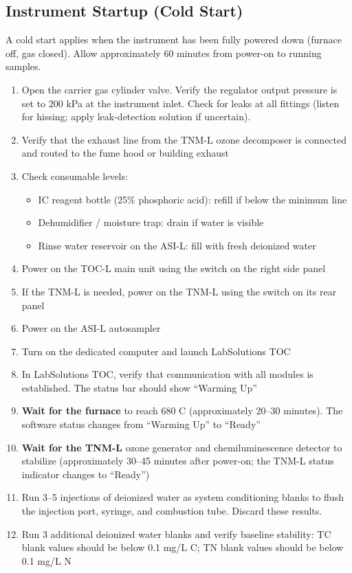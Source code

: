 \documentclass[
  11pt,
  letterpaper,
]{article}
\providecommand{\tightlist}{%
  \setlength{\itemsep}{0pt}\setlength{\parskip}{0pt}}
\begin{document}
\subsection{Instrument Startup (Cold
Start)}\label{instrument-startup-cold-start}

A cold start applies when the instrument has been fully powered down
(furnace off, gas closed). Allow approximately 60 minutes from power-on
to running samples.

\begin{enumerate}
\def\labelenumi{\arabic{enumi}.}
\tightlist
\item
  Open the carrier gas cylinder valve. Verify the regulator output
  pressure is set to 200 kPa at the instrument inlet. Check for leaks at
  all fittings (listen for hissing; apply leak-detection solution if
  uncertain).
\item
  Verify that the exhaust line from the TNM-L ozone decomposer is
  connected and routed to the fume hood or building exhaust
\item
  Check consumable levels:

  \begin{itemize}
  \tightlist
  \item
    IC reagent bottle (25\% phosphoric acid): refill if below the
    minimum line
  \item
    Dehumidifier / moisture trap: drain if water is visible
  \item
    Rinse water reservoir on the ASI-L: fill with fresh deionized water
  \end{itemize}
\item
  Power on the TOC-L main unit using the switch on the right side panel
\item
  If the TNM-L is needed, power on the TNM-L using the switch on its
  rear panel
\item
  Power on the ASI-L autosampler
\item
  Turn on the dedicated computer and launch LabSolutions TOC
\item
  In LabSolutions TOC, verify that communication with all modules is
  established. The status bar should show ``Warming Up''
\item
  \textbf{Wait for the furnace} to reach 680 C (approximately 20--30
  minutes). The software status changes from ``Warming Up'' to ``Ready''
\item
  \textbf{Wait for the TNM-L} ozone generator and chemiluminescence
  detector to stabilize (approximately 30--45 minutes after power-on;
  the TNM-L status indicator changes to ``Ready'')
\item
  Run 3--5 injections of deionized water as system conditioning blanks
  to flush the injection port, syringe, and combustion tube. Discard
  these results.
\item
  Run 3 additional deionized water blanks and verify baseline stability:
  TC blank values should be below 0.1 mg/L C; TN blank values should be
  below 0.1 mg/L N
\end{enumerate}
\end{document}

